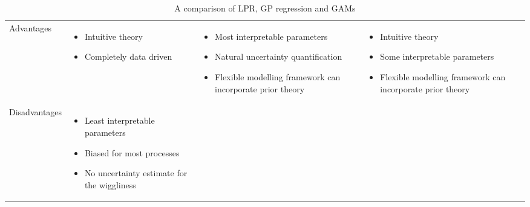 \documentclass[man, floatsintext]{apa7}
\begin{document}
\begin{table}[htbp]
  \begin{center}
    \begin{threeparttable}
      \caption{A comparison of LPR, GP regression and GAMs}
      \label{tab:meth_sum}
      \begin{singlespace}
        \begin{tabularx}{\linewidth}
          {>{\raggedright}s
            >{\raggedright}X
            >{\raggedright}X
            >{\raggedright\arraybackslash}X}
          \toprule
                                                                          &
                                                   &
                                                    &
          \\
          \midrule
          Advantages                                                      &
          \begin{itemize}
            \item Intuitive theory
            \item Completely data driven
          \end{itemize}                                    &
          \begin{itemize}
            \item Most interpretable parameters
            \item Natural uncertainty quantification
            \item Flexible modelling framework can incorporate prior theory
          \end{itemize} &
          \begin{itemize}
            \item Intuitive theory
            \item Some interpretable parameters
            \item Flexible modelling framework can incorporate prior theory
          \end{itemize}
          \\ \midrule
          Disadvantages                                                   &
          \begin{itemize}
            \item Least interpretable parameters
            \item Biased for most processes
            \item No uncertainty estimate for the wiggliness

\end{itemize}
\end{tabularx}
\end{singlespace}
\end{threeparttable}
\end{center}
\end{table}
\end{document}
